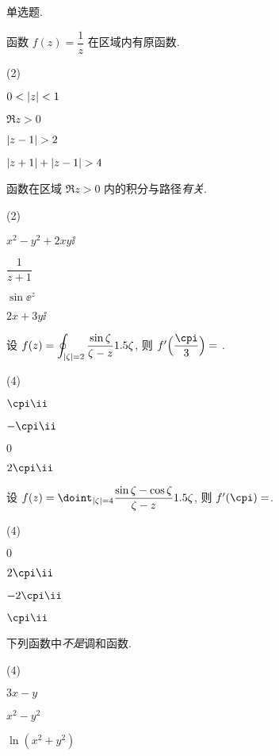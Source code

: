 \begin{homework}
  \item 单选题.
  \begin{homework}
    \item 函数 $f(z)=\dfrac 1z$ 在区域\fillbrace{}内有原函数.
      \begin{exchoice}(2)
        \item $0<\left|z\right|<1$
        \item $\Re z>0$
        \item $\abs{z-1}>2$
        \item $\abs{z+1}+\abs{z-1}>4$
      \end{exchoice}
    \item 函数\fillbrace{}在区域 $\Re z>0$ 内的积分与路径\emph{有关}.
      \begin{exchoice}(2)
        \item $x^2-y^2+2xy\ii$
        \item $\dfrac1{z+1}$
        \item $\sin\ee^z$
        \item $2x+3y\ii$
      \end{exchoice}
    \item 设 $\displaystyle f(z)=\oint_{\left|\zeta\right|=2}\frac{\sin \zeta}{\zeta-z}1.5 \zeta$, 则 $f'\Bigl(\dfrac\cpi3\Bigr)=$ \fillbrace{}.
      \begin{exchoice}(4)
        \item $\cpi\ii $
        \item $-\cpi\ii $
        \item $0$
        \item $2\cpi\ii $
      \end{exchoice}
    \item 设 $f(z)=\doint_{\abs{\zeta}=4}\dfrac{\sin\zeta-\cos\zeta}{\zeta-z}\d\zeta$, 则 $f'(\cpi)=$\fillbrace{}.
      \begin{exchoice}(4)
        \item $0$
        \item $2\cpi\ii $
        \item $-2\cpi\ii $
        \item $\cpi\ii $
      \end{exchoice}
    \item 下列函数中\fillbrace{}\emph{不是}调和函数.
      \begin{exchoice}(4)
        \item $3x-y$
        \item $x^2-y^2$
        \item $\ln(x^2+y^2)$

\end{exchoice}
\end{homework}
\end{homework}
